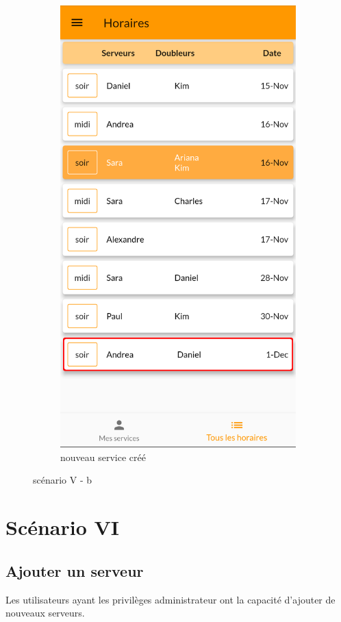 \begin{center}
\begin{figure}[h]
\begin{subfigure}{.45\textwidth}
            \includegraphics[width=0.6\linewidth]{screenshots/scenario_05/ajout_service_done.png}
            \caption{nouveau service créé}
            \label{fig:ajout_service_done}
        \end{subfigure}
        \caption{scénario V - b}
        \label{fig:scen05b}
    \end{figure}
\end{center}
\newpage
\section[Ajouter un serveur - Scénario VI]{Scénario VI}
    \subsection*{Ajouter un serveur}
    Les utilisateurs ayant les privilèges administrateur ont la capacité
    d'ajouter de nouveaux serveurs.


